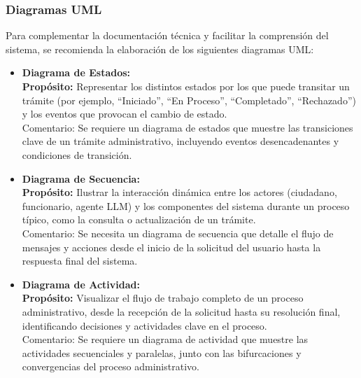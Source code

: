 \subsubsection{Diagramas UML}
Para complementar la documentación técnica y facilitar la comprensión del sistema, se recomienda la elaboración de los siguientes diagramas UML:
\begin{itemize}
    \item \textbf{Diagrama de Estados:} \\
    \textbf{Propósito:} Representar los distintos estados por los que puede transitar un trámite (por ejemplo, ``Iniciado'', ``En Proceso'', ``Completado'', ``Rechazado'') y los eventos que provocan el cambio de estado. \\
    Comentario: Se requiere un diagrama de estados que muestre las transiciones clave de un trámite administrativo, incluyendo eventos desencadenantes y condiciones de transición.
    \item \textbf{Diagrama de Secuencia:} \\
    \textbf{Propósito:} Ilustrar la interacción dinámica entre los actores (ciudadano, funcionario, agente LLM) y los componentes del sistema durante un proceso típico, como la consulta o actualización de un trámite. \\
    Comentario: Se necesita un diagrama de secuencia que detalle el flujo de mensajes y acciones desde el inicio de la solicitud del usuario hasta la respuesta final del sistema.
    \item \textbf{Diagrama de Actividad:} \\
    \textbf{Propósito:} Visualizar el flujo de trabajo completo de un proceso administrativo, desde la recepción de la solicitud hasta su resolución final, identificando decisiones y actividades clave en el proceso. \\
    Comentario: Se requiere un diagrama de actividad que muestre las actividades secuenciales y paralelas, junto con las bifurcaciones y convergencias del proceso administrativo.
\end{itemize}
